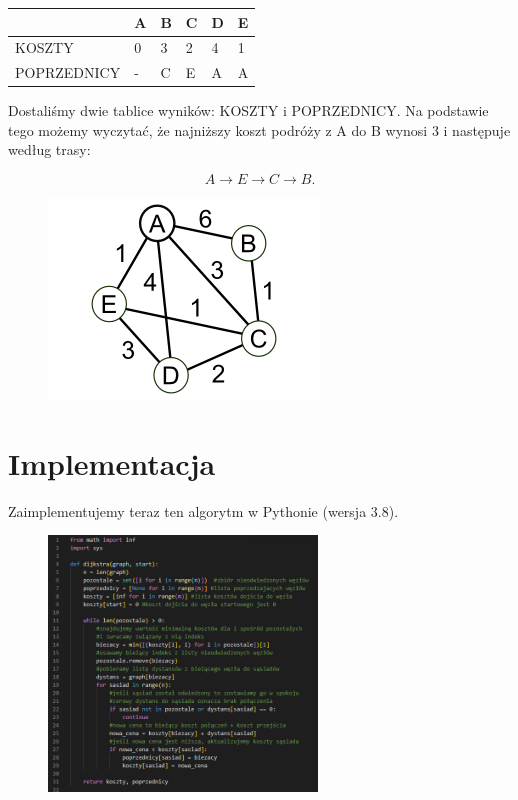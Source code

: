 \documentclass{beamer}
\begin{document}
\begin{frame}
	\begin{table}[]
		\begin{tabular}{|l|l|l|l|l|l|}
			\hline
			            & A & B & C & D & E \\ \hline
			KOSZTY      & 0 & 3 & 2 & 4 & 1 \\ \hline
			POPRZEDNICY & - & C & E & A & A \\ \hline
		\end{tabular}
	\end{table}

Dostaliśmy dwie tablice wyników: KOSZTY i POPRZEDNICY. Na podstawie tego możemy wyczytać, że najniższy koszt podróży z A do B wynosi 3 i następuje według trasy:

$$A\rightarrow E\rightarrow C\rightarrow B.$$

\begin{figure}
	\centering
	\includegraphics[width=0.3\linewidth]{i00.png}

\end{figure}

\end{frame}

\section{Implementacja}

\begin{frame}
Zaimplementujemy teraz ten algorytm w Pythonie (wersja 3.8).

\begin{figure}
	\includegraphics[height=6.8cm]{python.png}
\end{figure}

\end{frame}
\end{document}
